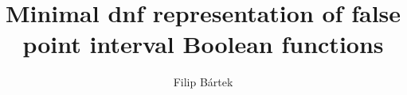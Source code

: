 \documentclass{article}
\author{Filip Bártek}
\title{Minimal \acrshort{dnf} representation of false point interval Boolean functions}
\begin{document}
\maketitle

\printglossaries
\end{document}
